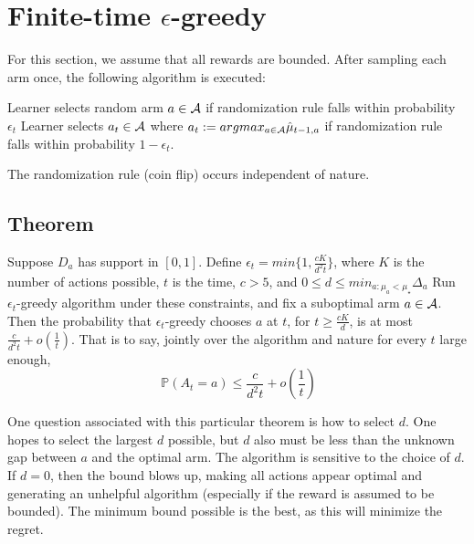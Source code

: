\documentclass[11pt]{article}
\begin{document}
\section{Finite-time $\epsilon$-greedy}

For this section, we assume that all rewards are bounded.  After sampling each arm once, the following algorithm is executed:

\renewcommand{\algorithmicfor}{\textbf{for}}
\renewcommand{\algorithmicendfor}{\textbf{done}}
\begin{algorithmic}[1]
\STATE Learner selects random arm $a \in \mathcal{A}$ if randomization rule falls within probability $\epsilon_{t}$
\STATE Learner selects $a_t \in \mathcal{A}$ where $a_t := argmax_{a \in \mathcal{A}} \hat{\mu}_{t-1, a}$ if randomization rule falls within probability $1-\epsilon_{t}$.
\ENDFOR
\end{algorithmic}


The randomization rule (coin flip) occurs independent of nature.

\subsection{Theorem}

Suppose $D_a$ has support in $[0, 1]$.  Define $\epsilon_t = min\{1, \frac{cK}{d^2t}\}$, where $K$ is the number of actions possible, $t$ is the time, $c > 5$, and $0 \le d \le min_{a:\mu_a < \mu_\star} \Delta_a$   Run $\epsilon_t$-greedy algorithm under these constraints, and fix a suboptimal arm $a \in \mathcal{A}$.  Then the probability that $\epsilon_t$-greedy chooses $a$ at $t$, for $t \ge \frac{cK}{d}$, is at most $\frac{c}{d^2t}+o(\frac{1}{t})$.  That is to say, jointly over the algorithm and nature for every $t$ large enough, 
\[
\ \mathbb{P}(A_t = a) \le \frac{c}{d^2t} + o(\frac{1}{t})
\]

One question associated with this particular theorem is how to select $d$.  One hopes to select the largest $d$ possible, but $d$ also must be less than the unknown gap between $a$ and the optimal arm.  
The algorithm is sensitive to the choice of $d$.  If $d=0$, then the bound blows up, making all actions appear optimal and generating an unhelpful algorithm (especially if the reward is assumed to be bounded).  The minimum bound possible is the best, as this will minimize the regret.
\end{document}
